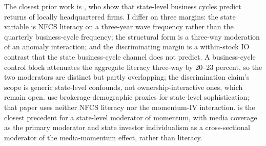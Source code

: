 The closest prior work is \citet{korniotisKumar2013}, who show that state-level business cycles predict returns of locally headquartered firms. I differ on three margins: the state variable is NFCS literacy on a three-year wave frequency rather than the quarterly business-cycle frequency; the structural form is a three-way moderation of an anomaly interaction; and the discriminating margin is a within-stock IO contrast that the state business-cycle channel does not predict. A business-cycle control block attenuates the aggregate literacy three-way by 20--23 percent, so the two moderators are distinct but partly overlapping; the discrimination claim's scope is generic state-level confounds, not ownership-interactive ones, which remain open. \citet{korniotisKumarPage2020} use brokerage-demographic proxies for state-level sophistication; that paper uses neither NFCS literacy nor the momentum-IV interaction. \citet{hillertJacobsMuller2014} is the closest precedent for a state-level moderator of momentum, with media coverage as the primary moderator and state investor individualism as a cross-sectional moderator of the media-momentum effect, rather than literacy.

